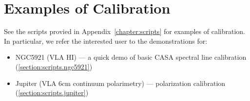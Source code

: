 \section{Examples of Calibration}
\label{section:cal.examples}

See the scripts provied in Appendix~\ref{chapter:scripts} for examples of
calibration.  In particular, we refer
the interested user to the demonstrations for:
\begin{itemize}
\item NGC5921 (VLA HI) --- a quick demo of basic CASA spectral line calibration
      (\ref{section:scripts.ngc5921})
\item Jupiter (VLA 6cm continuum polarimetry) --- polarization calibration
      (\ref{section:scripts.jupiter})
\end{itemize}

